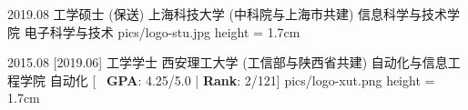 \begin{educations}
    \education
    {2019.08}
    {工学硕士 (保送)}
    {上海科技大学 (中科院与上海市共建)}
    {信息科学与技术学院}
    {电子科学与技术}
    {pics/logo-stu.jpg} {height = 1.7cm}

    \separator{0.5ex}
    \education
    {2015.08}
    [2019.06]
    {工学学士}
    {西安理工大学 (工信部与陕西省共建)}
    {自动化与信息工程学院}
    {自动化}
    [\textbullet ~ \textbf{GPA}: 4.25/5.0 | \textbf{Rank}: 2/121]
    {pics/logo-xut.png} {height = 1.7cm}

\end{educations}